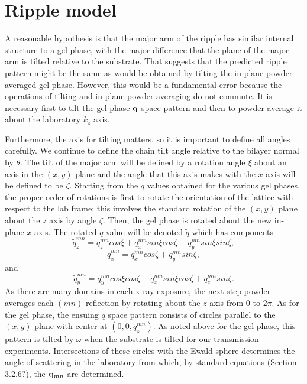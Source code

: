 \documentclass[
 preprint,
 showkeys, 
 amsmath,
 amssymb,
 aps,
]{revtex4-1}
\begin{document}
\section{Ripple model}
A reasonable hypothesis is that the major arm of the ripple has similar internal structure to a gel phase, with the major   difference that the plane of the major arm is tilted relative to the substrate.  That suggests that the predicted ripple pattern might be the same as would be obtained by tilting the in-plane powder averaged gel phase.  However, this would be a fundamental error because the operations of tilting and in-plane powder averaging do not commute.  It is necessary first to tilt the gel phase $\bold{q}$-space pattern and then to powder average it about the laboratory $k_z$ axis.  

Furthermore, the axis for tilting matters, so it is important to define all angles carefully.  We continue to define the chain tilt angle relative to the bilayer normal by $\theta$.  The tilt of the major arm will be defined by a rotation angle $\xi$ about an axis in the $(x,y)$ plane and the angle that this axis makes with the $x$ axis will be defined to be $\zeta$.  Starting from the $q$ values obtained for the various gel phases, the proper order of rotations is first to rotate the orientation of the lattice with respect to the lab frame; this involves the standard rotation of the $(x,y)$ plane about the $z$ axis by angle $\zeta$.  Then, the gel phase is rotated about the new in-plane $x$ axis. The rotated $q$ value will be denoted $\tilde{q}$ which has components
\begin{equation}\label{qtz}
\tilde{q}_{z}^{mn}=q_{z}^{mn}cos{\xi}+q_{x}^{mn}sin{\xi}cos{\zeta}-q_{y}^{mn}sin{\xi}sin{\zeta},
\end{equation}
\begin{equation}\label{qtx}
\tilde{q}_{x}^{mn}=q_{x}^{mn}cos{\zeta}+q_{y}^{mn}sin{\zeta},
\end{equation}
and
\begin{equation}\label{qty}
\tilde{q}_{y}^{mn}=q_{y}^{mn}cos{\xi}cos{\zeta}-q_{x}^{mn}sin{\xi}cos{\zeta}+q_{z}^{mn}sin{\zeta}.
\end{equation}
As there are many domains in each x-ray exposure, the next step powder averages each $(mn)$ reflection by rotating about the $z$ axis from $0$ to $2\pi$.  As for the gel phase, the ensuing $q$ space pattern consists of circles parallel to the $(x,y)$ plane with center at $(0,0,q_z^{mn})$.  As noted above for the gel phase, this pattern is tilted by $\omega$ when the substrate is tilted for our transmission experiments.  Intersections of these circles with the Ewald sphere determines the angle of scattering in the laboratory from which, by standard equations (Section 3.2.6?), the $\bold{q}_{mn}$ are determined.  
\end{document}
